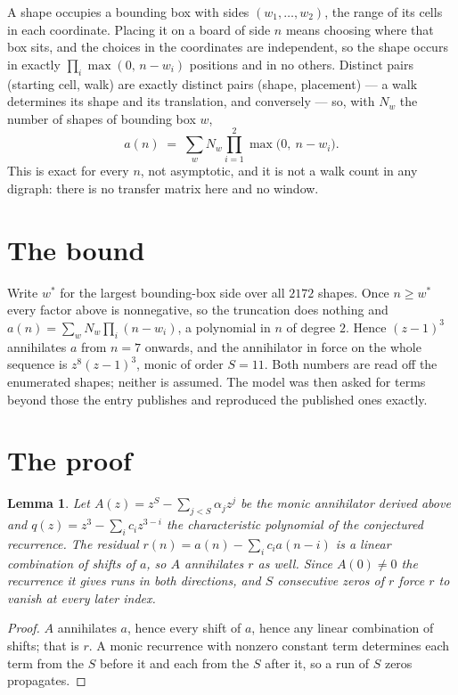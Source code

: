 \documentclass[11pt,a4paper]{article}
\theoremstyle{plain}
\newtheorem{lemma}[theorem]{Lemma}
\theoremstyle{definition}
\begin{document}
A shape occupies a bounding box with sides $(w_1,\dots,w_{2})$, the range of its cells in each
coordinate. Placing it on a board of side $n$ means choosing where that box sits, and the
choices in the coordinates are independent, so the shape occurs in exactly
$\prod_{i}\max(0,\,n-w_i)$ positions and in no others. Distinct pairs (starting cell,
walk) are exactly distinct pairs (shape, placement) --- a walk determines its shape and its
translation, and conversely --- so, with $N_w$ the number of shapes of bounding box $w$,
\[
a(n)\;=\;\sum_{w} N_w \prod_{i=1}^{2}\max\bigl(0,\ n-w_i\bigr).
\]
This is exact for every $n$, not asymptotic, and it is not a walk count in any digraph: there is
no transfer matrix here and no window.

\section{The bound}

Write $w^\ast$ for the largest bounding-box side over all $2172$ shapes. Once $n\ge w^\ast$
every factor above is nonnegative, so the truncation does nothing and
$a(n)=\sum_w N_w\prod_i(n-w_i)$, a polynomial in $n$ of degree $2$. Hence $(z-1)^{3}$
annihilates $a$ from $n=7$ onwards, and the annihilator in force on the whole sequence is
$z^{8}(z-1)^{3}$, monic of order $S=11$. Both numbers are read off the enumerated
shapes; neither is assumed. The model was then asked for terms beyond those the entry publishes
and reproduced the published ones exactly.

\section{The proof}

\begin{lemma}\label{lem:crit}
Let $A(z)=z^S-\sum_{j<S}\alpha_jz^{j}$ be the monic annihilator derived above and
$q(z)=z^{3}-\sum_ic_iz^{3-i}$ the characteristic polynomial of the conjectured
recurrence. The residual $r(n)=a(n)-\sum_ic_ia(n-i)$ is a linear combination of shifts of $a$,
so $A$ annihilates $r$ as well. Since $A(0)\ne0$ the recurrence it gives runs in both
directions, and $S$ consecutive zeros of $r$ force $r$ to vanish at every later index.
\end{lemma}

\begin{proof}
$A$ annihilates $a$, hence every shift of $a$, hence any linear combination of shifts; that is
$r$. A monic recurrence with nonzero constant term determines each term from the $S$ before it
and each from the $S$ after it, so a run of $S$ zeros propagates.
\end{proof}
\end{document}
